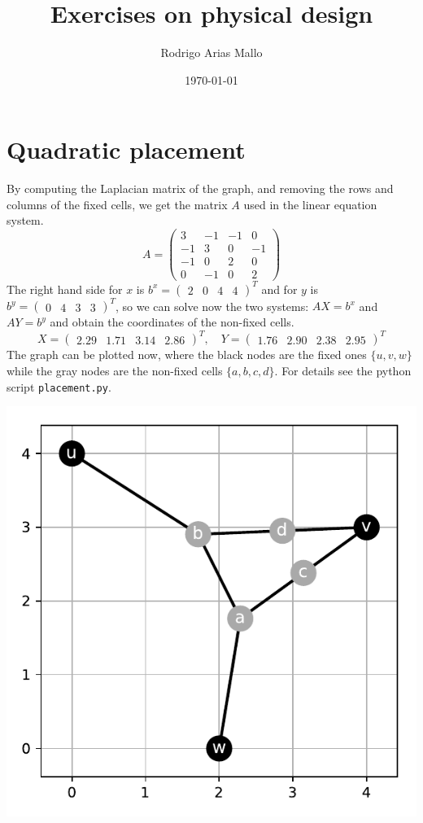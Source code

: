 \documentclass[a4paper]{article}
\title{Exercises on physical design}
\author{Rodrigo Arias Mallo}
\date{\today}
\newcommand*\mat[1]{ \begin{pmatrix} #1 \end{pmatrix}}
\begin{document}
\maketitle

\section{Quadratic placement}


By computing the Laplacian matrix of the graph, and removing the rows and 
columns of the fixed cells, we get the matrix $A$ used in the linear equation 
system.
%
$$ A = \mat{
	 3 & -1 & -1 &  0 \\
	-1 &  3 &  0 & -1 \\
	-1 &  0 &  2 &  0 \\
	 0 & -1 &  0 &  2}$$
%
The right hand side for $x$ is $b^x = \mat{2 & 0 & 4 & 4}^T$ and for $y$ is $b^y 
= \mat{0 & 4 & 3 & 3}^T$, so we can solve now the two systems: $AX = b^x$ and 
$AY = b^y$ and obtain the coordinates of the non-fixed cells.
%
$$ X = \mat{2.29 & 1.71 & 3.14 & 2.86}^T,\quad
Y = \mat{1.76 & 2.90 & 2.38 & 2.95}^T $$
%
The graph can be plotted now, where the black nodes are the fixed ones 
$\{u,v,w\}$ while the gray nodes are the non-fixed cells $\{a,b,c,d\}$. For 
details see the python script \texttt{placement.py}.
%
\begin{center}
\includegraphics[width=.7\textwidth]{placement.pdf}
\end{center}
%
\end{document}
